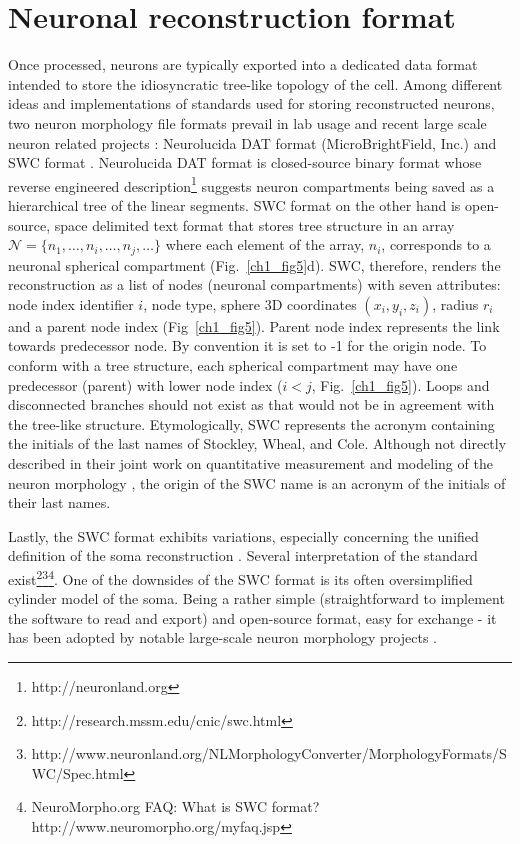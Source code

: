 \section{Neuronal reconstruction format}
Once processed, neurons are typically exported into a dedicated data format intended to store the idiosyncratic tree-like topology of the cell. Among different ideas and implementations of standards used for storing reconstructed neurons, two neuron morphology file formats prevail in lab usage and recent large scale neuron related projects \cite{bakker2016web}: Neurolucida DAT format (MicroBrightField, Inc.) and SWC format \cite{cannon1998line}. Neurolucida DAT format is closed-source binary format whose reverse engineered description\footnote{http://neuronland.org} suggests neuron compartments being saved as a hierarchical tree of the linear segments. SWC format on the other hand is open-source, space delimited text format that stores tree structure in an array $\mathcal{N} = \{ n_1, \dots , n_i, \dots , n_j, \dots  \}$ where each element of the array, $n_i$, corresponds to a neuronal spherical compartment (Fig.~\ref{ch1_fig5}d). SWC, therefore, renders the reconstruction as a list of nodes (neuronal compartments) with seven attributes: node index identifier $i$, node type, sphere 3D coordinates $(x_i,y_i,z_i)$, radius $r_i$ and a parent node index (Fig~\ref{ch1_fig5}). Parent node index represents the link towards predecessor node. By convention it is set to -1 for the origin node. To conform with a tree structure, each spherical compartment may have one predecessor (parent) with lower node index ($i<j$, Fig.~\ref{ch1_fig5}). Loops and disconnected branches should not exist as that would not be in agreement with the tree-like structure. Etymologically, SWC represents the acronym containing the initials of the last names of Stockley, Wheal, and Cole. Although not directly described in their joint work on quantitative measurement and modeling of the neuron morphology \cite{stockley1993system}, the origin of the SWC name is an acronym of the initials of their last names. 

Lastly, the SWC format exhibits variations, especially concerning the unified definition of the soma reconstruction \cite{bakker2016web}. Several interpretation of the standard exist\footnote{http://research.mssm.edu/cnic/swc.html}\footnote{http://www.neuronland.org/NLMorphologyConverter/MorphologyFormats/SWC/Spec.html}\footnote{NeuroMorpho.org FAQ: What is SWC format? http://www.neuromorpho.org/myfaq.jsp}. One of the downsides of the SWC format is its often oversimplified cylinder model of the soma. Being a rather simple (straightforward to implement the software to read and export) and open-source format, easy for exchange - it has been adopted by notable large-scale neuron morphology projects \cite{ascoli2007neuromorpho,peng2015bigneuron}.

